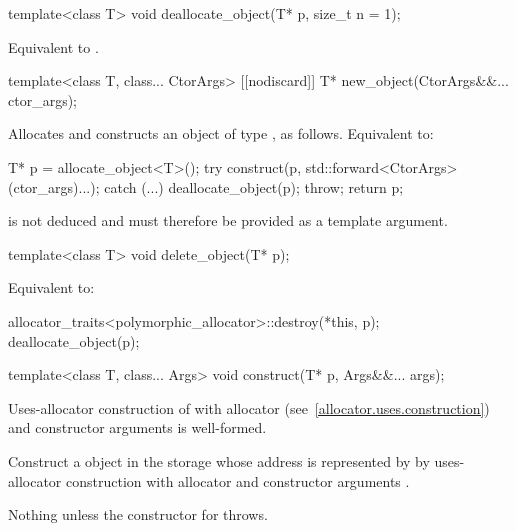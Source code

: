 %
\begin{itemdecl}
template<class T>
  void deallocate_object(T* p, size_t n = 1);
\end{itemdecl}

\begin{itemdescr}
\pnum
\effects
Equivalent to .
\end{itemdescr}

%
\begin{itemdecl}
template<class T, class... CtorArgs>
  [[nodiscard]] T* new_object(CtorArgs&&... ctor_args);
\end{itemdecl}

\begin{itemdescr}
\pnum
\effects
Allocates and constructs an object of type , as follows.\newline
Equivalent to:
\begin{codeblock}
T* p = allocate_object<T>();
try {
  construct(p, std::forward<CtorArgs>(ctor_args)...);
} catch (...) {
  deallocate_object(p);
  throw;
}
return p;
\end{codeblock}

\pnum
\begin{note}
 is not deduced and must therefore be provided as a template argument.
\end{note}
\end{itemdescr}

%
\begin{itemdecl}
template<class T>
  void delete_object(T* p);
\end{itemdecl}

\begin{itemdescr}
\pnum
\effects
Equivalent to:
\begin{codeblock}
allocator_traits<polymorphic_allocator>::destroy(*this, p);
deallocate_object(p);
\end{codeblock}
\end{itemdescr}

%
\begin{itemdecl}
template<class T, class... Args>
  void construct(T* p, Args&&... args);
\end{itemdecl}

\begin{itemdescr}
\pnum
\mandates
Uses-allocator construction of 
with allocator  (see~\ref{allocator.uses.construction})
and constructor arguments  is well-formed.

\pnum
\effects
Construct a  object in the storage
whose address is represented by 
by uses-allocator construction with allocator 
and constructor arguments .

\pnum
\throws
Nothing unless the constructor for  throws.
\end{itemdescr}

